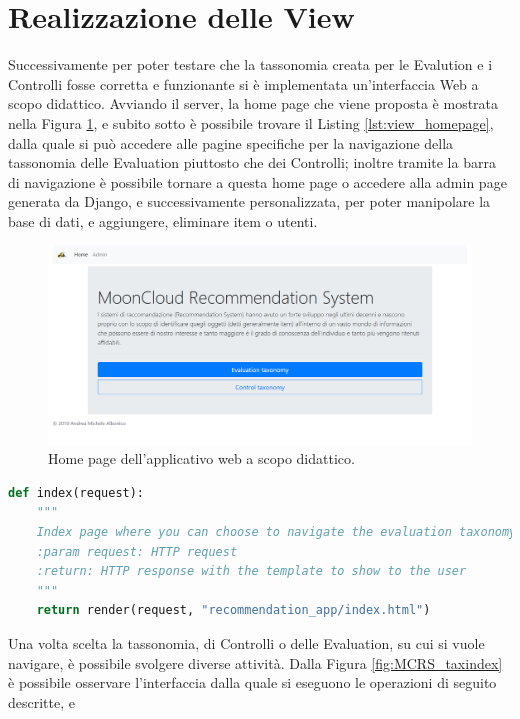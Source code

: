 \section*{Realizzazione delle View}
Successivamente per poter testare che la tassonomia creata per le Evalution e i Controlli fosse corretta e funzionante si è 
implementata un'interfaccia Web a scopo didattico.
Avviando il server, la home page che viene proposta è mostrata nella Figura \ref{fig:MCRS_homepage}, e subito 
sotto è possibile trovare il Listing \ref{lst:view_homepage}, dalla quale si può  
accedere alle pagine specifiche per la navigazione della tassonomia delle Evaluation piuttosto che dei Controlli; inoltre 
tramite la barra di navigazione è possibile tornare a questa home page o accedere alla admin page generata da Django, e 
successivamente personalizzata, per poter manipolare la base di dati, e aggiungere, eliminare item o utenti.
%
\begin{figure}[ht!]
    \includegraphics[scale=0.3]{images/MCRS_homepage.png}
    \caption{Home page dell'applicativo web a scopo didattico.}
    \label{fig:MCRS_homepage}
\end{figure}
\lstset{style=python_code_style}
\begin{lstlisting}[language=Python, label=lst:view_homepage, caption={Parte principale del codice delle View della soluzione per gestire l'accesso 
    alla home page.}]
def index(request):
    """
    Index page where you can choose to navigate the evaluation taxonomy or the control taxonomy.
    :param request: HTTP request
    :return: HTTP response with the template to show to the user
    """
    return render(request, "recommendation_app/index.html")
\end{lstlisting}
%
Una volta scelta la tassonomia, di Controlli o delle Evaluation, su cui si vuole navigare, è possibile svolgere diverse attività. 
Dalla Figura \ref{fig:MCRS_taxindex} è possibile osservare l'interfaccia dalla quale si eseguono le operazioni di seguito descritte, e
